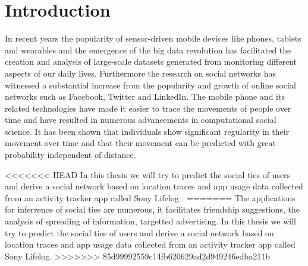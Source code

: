 \section{Introduction}
In recent years the popularity of sensor-driven mobile devices like phones, tablets and wearables and the emergence of the big data revolution has facilitated the creation and analysis of large-scale datasets generated from monitoring different aspects of our daily lives\cite{lazer2009life}. Furthermore the research on social networks has witnessed a substantial increase from the popularity and growth of online social networks such as Facebook, Twitter and LinkedIn\cite{social_networks}. The mobile phone and its related technologies have made it easier to trace the movements of people over time and have resulted in numerous advancements in computational social science. It has been shown that individuals show significant regularity in their movement over time\cite{Uihmp} and that their movement can be predicted with great probability independent of distance\cite{LoPiHM}.

<<<<<<< HEAD
In this thesis we will try to predict the social ties of users and derive a social network based on location traces and app usage data collected from an activity tracker app called Sony Lifelog \cite{sonyLifeLog}.
=======
The applications for inferrence of social ties are numerous, it facilitates friendship suggestions, the analysis of spreading of information, targetted advertising.
In this thesis we will try to predict the social ties of users and derive a social network based on location traces and app usage data collected from an activity tracker app called Sony Lifelog\cite{sonyLifeLog}.
>>>>>>> 85d99992559c14fb620629ad2d949246edba211b


